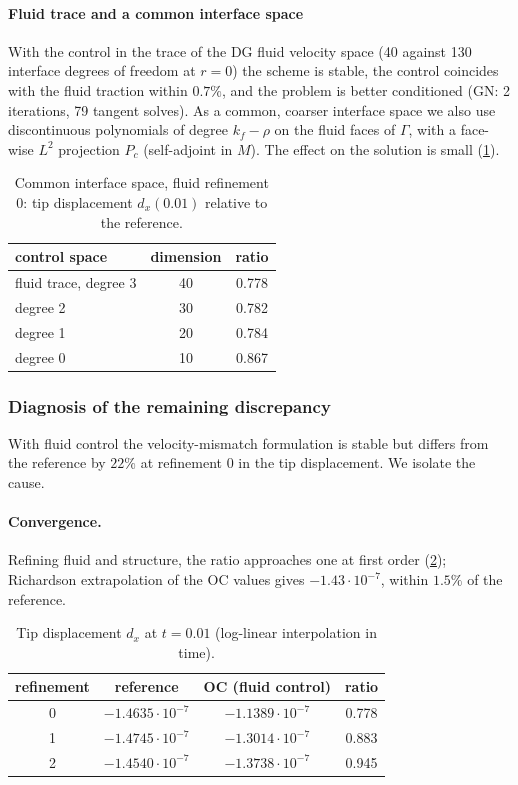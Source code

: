 \documentclass[11pt,a4paper]{article}
\theoremstyle{definition}
\theoremstyle{remark}
\newcommand{\G}{\Gamma}
\newcommand{\M}{M}
\begin{document}
\paragraph{Fluid trace and a common interface space}

With the control in the trace of the DG fluid velocity space (40 against 130 interface degrees of
freedom at $r=0$) the scheme is stable, the control coincides with the fluid traction within
$0.7\%$, and the problem is better conditioned (GN: 2 iterations, 79 tangent solves). As a common,
coarser interface space we also use discontinuous polynomials of degree $k_f-\rho$ on the fluid
faces of $\G$, with a face-wise $L^2$ projection $P_c$ (self-adjoint in $\M$). The effect on the
solution is small (\cref{tab:common}).

\begin{table}[ht]\centering
\caption{Common interface space, fluid refinement 0: tip displacement $d_x(0.01)$ relative to the
reference.}\label{tab:common}
\begin{tabular}{lcc}
\toprule
control space & dimension & ratio\\
\midrule
fluid trace, degree 3 & 40 & 0.778\\
degree 2 & 30 & 0.782\\
degree 1 & 20 & 0.784\\
degree 0 & 10 & 0.867\\
\bottomrule
\end{tabular}
\end{table}

\subsubsection{Diagnosis of the remaining discrepancy}\label{sec:diagnosis}

With fluid control the velocity-mismatch formulation is stable but differs from the reference by
$22\%$ at refinement 0 in the tip displacement. We isolate the cause.

\paragraph{Convergence.} Refining fluid and structure, the ratio approaches one at first order
(\cref{tab:hstudy}); Richardson extrapolation of the OC values gives $-1.43\cdot10^{-7}$, within
$1.5\%$ of the reference.

\begin{table}[ht]\centering
\caption{Tip displacement $d_x$ at $t=0.01$ (log-linear interpolation in time).}\label{tab:hstudy}
\begin{tabular}{cccc}
\toprule
refinement & reference & OC (fluid control) & ratio\\
\midrule
0 & $-1.4635\cdot10^{-7}$ & $-1.1389\cdot10^{-7}$ & 0.778\\
1 & $-1.4745\cdot10^{-7}$ & $-1.3014\cdot10^{-7}$ & 0.883\\
2 & $-1.4540\cdot10^{-7}$ & $-1.3738\cdot10^{-7}$ & 0.945\\
\bottomrule
\end{tabular}
\end{table}
\end{document}
